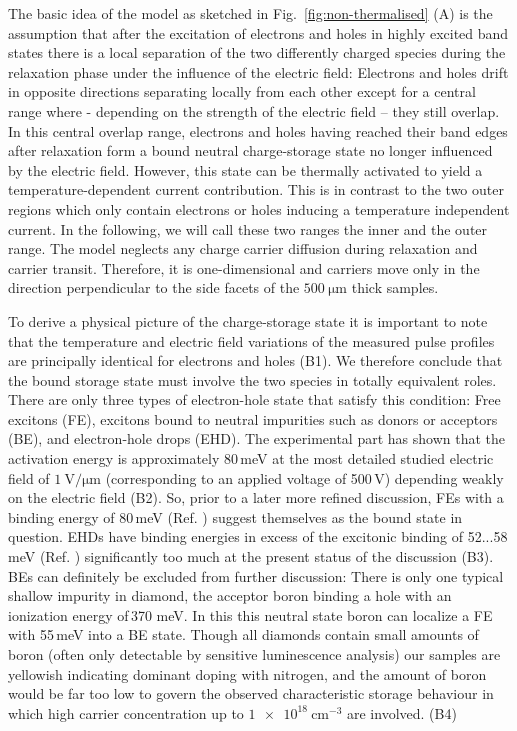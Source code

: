 The basic idea of the model as sketched in Fig.~\ref{fig:non-thermalised} (A) is the assumption that after the excitation of electrons and holes in highly excited band states
 there is a local separation of the two differently charged species during the relaxation phase under the influence of the electric field: 
 Electrons and holes drift in opposite directions separating locally from each other except for a central range where -  depending on the strength of the electric field  --  they still overlap. 
In this central overlap range, electrons and holes having reached their band edges after relaxation form a bound neutral charge-storage state no longer influenced by the electric field. 
However, this state can be thermally activated to yield a temperature-dependent current contribution. 
This is in contrast to the two outer regions which only contain electrons or holes inducing a temperature independent current. 
In the following, we will call these two ranges the inner and the outer range. 
The model neglects any charge carrier diffusion during relaxation and carrier transit. 
Therefore, it is one-dimensional and carriers move only in the direction perpendicular to the side facets of the $\SI{500}{\um}$ thick samples.

To derive a physical picture of the charge-storage state it is important to note that the temperature and electric field variations of the measured pulse profiles 
 are principally identical for electrons and holes {\color{red}(B1)}. 
We therefore conclude that the bound storage state must involve the two species in totally equivalent roles. 
There are only three types of electron-hole state that satisfy this condition:
 Free excitons (FE), excitons bound to neutral impurities such as donors or acceptors (BE), and electron-hole drops (EHD). 
The experimental part has shown that the activation energy is approximately 80\,meV at the most detailed studied electric field of $\SI{1}{\volt/\um}$ 
 (corresponding to an applied voltage of 500\,V) depending weakly on the electric field {\color{red}(B2)}. 
So, prior to a later more refined discussion, FEs with a binding energy of 80\,meV (Ref.   ) suggest themselves as the bound state in question. 
EHDs have binding energies in excess of the excitonic binding of 52...58\,meV (Ref.    ) significantly too much at the present status of the discussion {\color{red}(B3)}. 
BEs can definitely be excluded from further discussion: There is only one typical shallow impurity in diamond, the acceptor boron binding a hole with an ionization energy of\,370 meV. 
In this this neutral state boron can localize a FE with 55\,meV into a BE state. 
Though all diamonds contain small amounts of boron (often only detectable by sensitive luminescence analysis) our samples are yellowish indicating dominant doping with nitrogen,
 and the amount of boron would be far too low to govern the observed characteristic storage behaviour in which high carrier concentration up to $\SI{1e18}{\cm^{-3}}$ are involved. {\color{red}(B4)}
 

